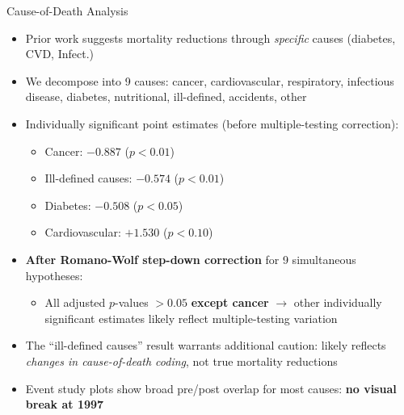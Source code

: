 \documentclass[aspectratio=169,usenames,dvipsnames]{beamer}
\begin{document}



\begin{frame}{Cause-of-Death Analysis}\label{cod}
\small
\begin{itemize}
  \item[$\circ$] Prior work suggests mortality reductions through \textit{specific} causes (diabetes, CVD, Infect.)
  \vspace{4pt}
  \item[$\circ$] We decompose into 9 causes: cancer, cardiovascular, respiratory, infectious disease, diabetes, nutritional, ill-defined, accidents, other
  \vspace{4pt}
  \item[$\circ$] Individually significant point estimates (before multiple-testing correction):
    \begin{itemize}
      \item \textcolor{blue1}{Cancer}: $-0.887$ ($p<0.01$)
      \item \textcolor{blue1}{Ill-defined causes}: $-0.574$ ($p<0.01$)
      \item \textcolor{blue1}{Diabetes}: $-0.508$ ($p<0.05$)
      \item \textcolor{redUT}{Cardiovascular}: $+1.530$ ($p<0.10$)
    \end{itemize}
  \vspace{4pt}
  \item[$\circ$] \textbf{After Romano-Wolf step-down correction} for 9 simultaneous hypotheses:
    \begin{itemize}
      \item All adjusted $p$-values $> 0.05$ \textbf{except cancer} $\to$ other individually significant estimates likely reflect multiple-testing variation
    \end{itemize}
  \vspace{4pt}
  \item[$\circ$] The ``ill-defined causes'' result warrants additional caution: likely reflects \textit{changes in cause-of-death coding}, not true mortality reductions
  \vspace{4pt}
  \item[$\circ$] Event study plots show broad pre/post overlap for most causes: \textbf{no visual break at 1997}
\end{itemize}
\end{frame}
\end{document}
